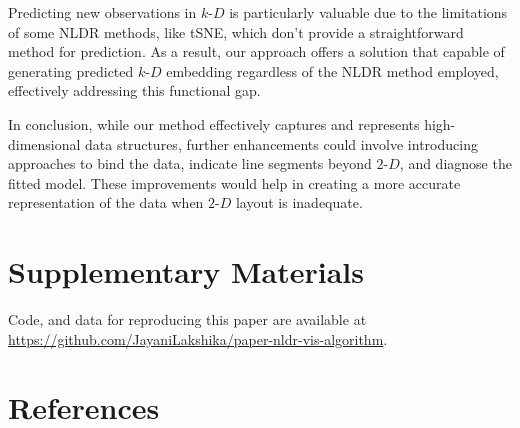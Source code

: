 \documentclass[
  12pt]{article}
\newcommand\kD{$k\text{-}D$}
\newcommand\gD{$2\text{-}D$}
\begin{document}
Predicting new observations in \kD{} is particularly valuable due to the
limitations of some NLDR methods, like tSNE, which don't provide a
straightforward method for prediction. As a result, our approach offers
a solution that capable of generating predicted \kD{} embedding
regardless of the NLDR method employed, effectively addressing this
functional gap.

In conclusion, while our method effectively captures and represents
high-dimensional data structures, further enhancements could involve
introducing approaches to bind the data, indicate line segments beyond
\gD{}, and diagnose the fitted model. These improvements would help in
creating a more accurate representation of the data when \gD{} layout is
inadequate.

\section{Supplementary Materials}\label{supplementary-materials}

Code, and data for reproducing this paper are available at
\url{https://github.com/JayaniLakshika/paper-nldr-vis-algorithm}.

\section*{References}\label{references}

\renewcommand{\bibsection}{}


\newpage{}
\end{document}

